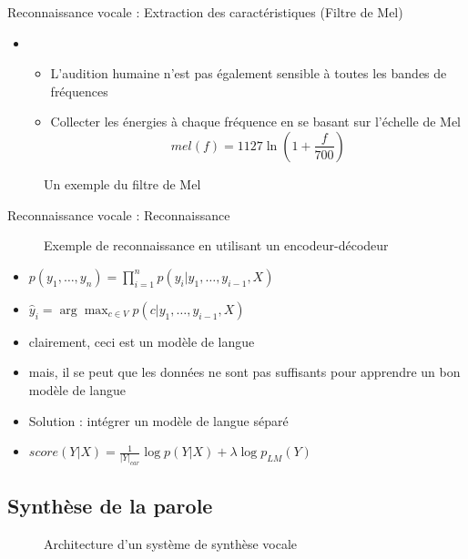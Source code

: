 \documentclass{KodeBook}
\begin{document}
Reconnaissance vocale : Extraction des caractéristiques (Filtre de Mel)

\begin{itemize}
	\item {}
	\begin{itemize}
		\item L'audition humaine n'est pas également sensible à toutes les bandes de fréquences
		\item Collecter les énergies à chaque fréquence en se basant sur l'échelle de Mel
		\[mel(f) = 1127 \ln (1 + \frac{f}{700})\]
	\end{itemize}
\end{itemize}
\begin{figure}
	\centering
	\caption{Un exemple du filtre de Mel \cite{2020-jurafsky-martin}}
\end{figure}

Reconnaissance vocale : Reconnaissance
\begin{figure}
	\centering
	\caption{Exemple de reconnaissance en utilisant un encodeur-décodeur \cite{2020-jurafsky-martin}}
\end{figure}

\begin{itemize}
	\item $p(y_1, \ldots, y_n) = \prod\limits_{i=1}^n p(y_i| y_1, \ldots, y_{i-1}, X)$
	
	\item $\hat{y}_i = \arg\max_{c \in V} p(c| y_1, \ldots, y_{i-1}, X)$
	
	\item clairement, ceci est un modèle de langue
	\item mais, il se peut que les données ne sont pas suffisants pour apprendre un bon modèle de langue
	\item Solution : intégrer un modèle de langue séparé
	
	\item $score(Y|X) = \frac{1}{|Y|_{car}} \log p(Y|X) + \lambda \log p_{LM}(Y)$
\end{itemize}


\subsection{Synthèse de la parole}


\begin{figure}
	\centering
	\caption{Architecture d'un système de synthèse vocale \cite{2017-Hinterleitner}}
\end{figure}




\begin{discussion}



\end{discussion}

\ifx\wholebook\relax\else
% 
% 
	
\end{document}
